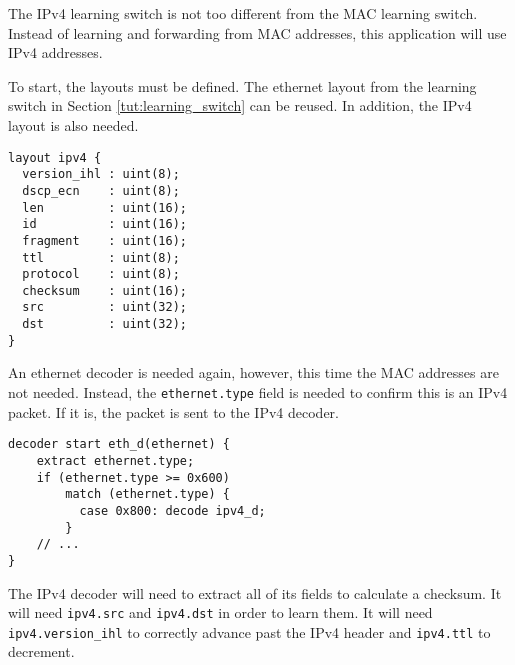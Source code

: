 The IPv4 learning switch is not too different from the MAC learning switch. 
Instead of learning and forwarding from MAC addresses, this application will use 
IPv4 addresses.

To start, the layouts must be defined. The ethernet layout
from the learning switch in Section \ref{tut:learning_switch} can be reused. 
In addition, the IPv4 layout is also needed.

\begin{codepage}
\begin{lstlisting}
layout ipv4 {
  version_ihl : uint(8);
  dscp_ecn    : uint(8);
  len         : uint(16);
  id          : uint(16);
  fragment    : uint(16);
  ttl         : uint(8);
  protocol    : uint(8);
  checksum    : uint(16);
  src         : uint(32);
  dst         : uint(32);
}
\end{lstlisting}
\end{codepage}

An ethernet decoder is needed again, however, this time the MAC
addresses are not needed. Instead, the \texttt{ethernet.type} field is needed to confirm
this is an IPv4 packet. If it is, the packet is sent to the IPv4 decoder.

\begin{codepage}
\begin{lstlisting}
decoder start eth_d(ethernet) {
	extract ethernet.type;
	if (ethernet.type >= 0x600)
	    match (ethernet.type) {
	      case 0x800: decode ipv4_d;
	    }
	// ...
}
\end{lstlisting}
\end{codepage}

The IPv4 decoder will need to extract all of its fields to calculate a checksum. It will need \texttt{ipv4.src} and \texttt{ipv4.dst} in
order to learn them. It will need \texttt{ipv4.version\_ihl} to
correctly advance past the IPv4 header and \texttt{ipv4.ttl} to decrement.


